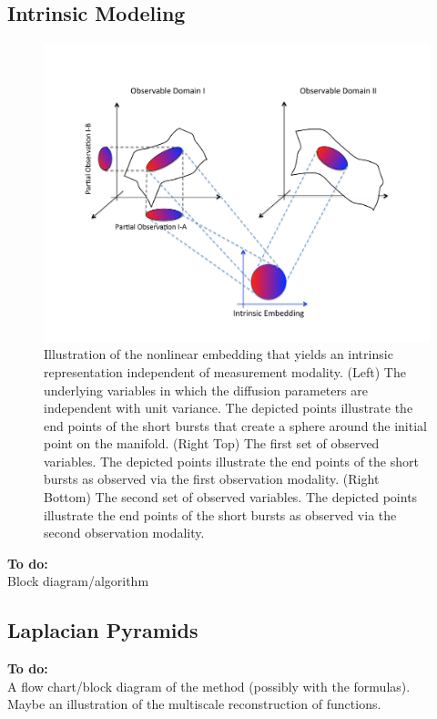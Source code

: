 \documentclass[12pt]{article}
\begin{document}
\subsection{Intrinsic Modeling}
\begin{figure}[H]
\includegraphics[width=\textwidth]{IntrinsicEmbeddingIllustration2.pdf}
\caption{Illustration of the nonlinear embedding that yields an intrinsic representation independent of measurement modality. (Left) The underlying variables in which the diffusion parameters are independent with unit variance. The depicted points illustrate the end points of the short bursts that create a sphere around the initial point on the manifold. (Right Top) The first set of observed variables. The depicted points illustrate the end points of the short bursts as observed via the first observation modality. (Right Bottom) The second set of observed variables. The depicted points illustrate the end points of the short bursts as observed via the second observation modality.}
\end{figure}

{\bf To do:} \\
Block diagram/algorithm

\subsection{Laplacian Pyramids}

{\bf To do:} \\
A flow chart/block diagram of the method (possibly with the formulas).\\
Maybe an illustration of the multiscale reconstruction of functions.
\end{document}

